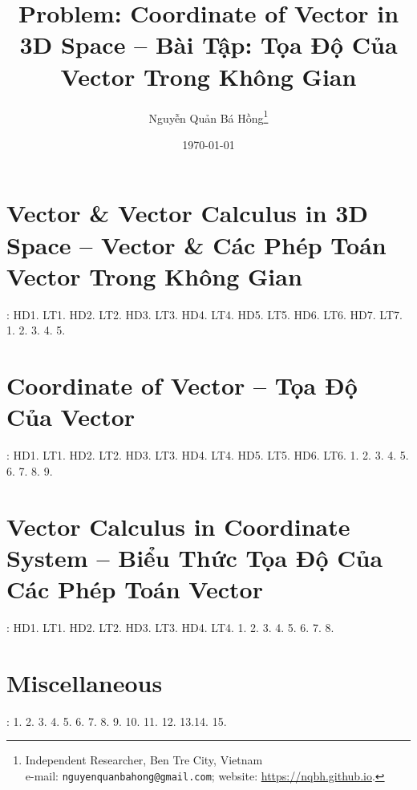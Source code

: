 \documentclass{article}
\title{Problem: Coordinate of Vector in 3D Space -- Bài Tập: Tọa Độ Của Vector Trong Không Gian}
\author{Nguyễn Quản Bá Hồng\footnote{Independent Researcher, Ben Tre City, Vietnam\\e-mail: \texttt{nguyenquanbahong@gmail.com}; website: \url{https://nqbh.github.io}.}}
\date{\today}
\begin{document}
\maketitle
\tableofcontents


\section{Vector \& Vector Calculus in 3D Space -- Vector \& Các Phép Toán Vector Trong Không Gian}
\cite[Chap. II, \S1, pp. 56--64]{SGK_Toan_12_Canh_Dieu_tap_1}: HD1. LT1. HD2. LT2. HD3. LT3. HD4. LT4. HD5. LT5. HD6. LT6. HD7. LT7. 1. 2. 3. 4. 5.


\section{Coordinate of Vector -- Tọa Độ Của Vector}
\cite[Chap. II, \S2, pp. 56--73]{SGK_Toan_12_Canh_Dieu_tap_1}: HD1. LT1. HD2. LT2. HD3. LT3. HD4. LT4. HD5. LT5. HD6. LT6. 1. 2. 3. 4. 5. 6. 7. 8. 9.


\section{Vector Calculus in Coordinate System -- Biểu Thức Tọa Độ Của Các Phép Toán Vector}
\cite[Chap. II, \S3, pp. 74--81]{SGK_Toan_12_Canh_Dieu_tap_1}: HD1. LT1. HD2. LT2. HD3. LT3. HD4. LT4. 1. 2. 3. 4. 5. 6. 7. 8.


\section{Miscellaneous}
\cite[BTCCII, pp. 82--83]{SGK_Toan_12_Canh_Dieu_tap_1}: 1. 2. 3. 4. 5. 6. 7. 8. 9. 10. 11. 12. 13.14. 15.


\printbibliography[heading=bibintoc]
	
\end{document}
